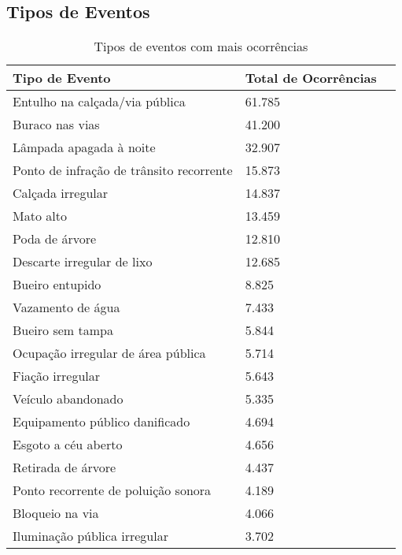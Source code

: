 \subsection*{Tipos de Eventos}

\begin{table}[h]
	\centering
	\caption{Tipos de eventos com mais ocorrências}
	\label{tab:tiposevento}
	\begin{tabularx}{\textwidth}{|X|l|l|}
		\hline
		\textbf{Tipo de Evento}                  & \textbf{Total de Ocorrências} \\
		\hline
		Entulho na calçada/via pública           & 61.785                        \\
		Buraco nas vias                          & 41.200                        \\
		Lâmpada apagada à noite                  & 32.907                        \\
		Ponto de infração de trânsito recorrente & 15.873                        \\
		Calçada irregular                        & 14.837                        \\
		Mato alto                                & 13.459                        \\
		Poda de árvore                           & 12.810                        \\
		Descarte irregular de lixo               & 12.685                        \\
		Bueiro entupido                          & 8.825                         \\
		Vazamento de água                        & 7.433                         \\
		Bueiro sem tampa                         & 5.844                         \\
		Ocupação irregular de área pública       & 5.714                         \\
		Fiação irregular                         & 5.643                         \\
		Veículo abandonado                       & 5.335                         \\
		Equipamento público danificado           & 4.694                         \\
		Esgoto a céu aberto                      & 4.656                         \\
		Retirada de árvore                       & 4.437                         \\
		Ponto recorrente de poluição sonora      & 4.189                         \\
		Bloqueio na via                          & 4.066                         \\
		Iluminação pública irregular             & 3.702                         \\
		\hline
	\end{tabularx}
\end{table}

